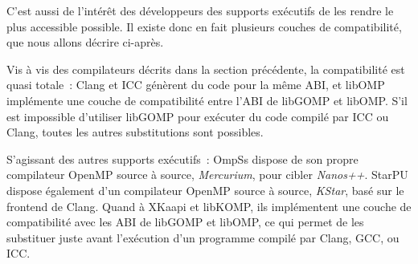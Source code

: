 C'est aussi de l'intérêt des développeurs des supports exécutifs de les rendre le plus accessible possible.
Il existe donc en fait plusieurs couches de compatibilité, que nous allons décrire ci-après.

Vis à vis des compilateurs décrits dans la section précédente, la compatibilité est quasi totale~: Clang et ICC génèrent du code pour la même ABI, et libOMP implémente une couche de compatibilité entre l'ABI de libGOMP et libOMP.
S'il est impossible d'utiliser libGOMP pour exécuter du code compilé par ICC ou Clang, toutes les autres substitutions sont possibles.

S'agissant des autres supports exécutifs~: OmpSs dispose de son propre compilateur OpenMP source à source, \emph{Mercurium}, pour cibler \emph{Nanos++}. StarPU dispose également d'un compilateur OpenMP source à source, \emph{KStar}, basé sur le frontend de Clang.
Quand à XKaapi et libKOMP, ils implémentent une couche de compatibilité avec les ABI de libGOMP et libOMP, ce qui permet de les substituer juste avant l'exécution d'un programme compilé par Clang, GCC, ou ICC.


